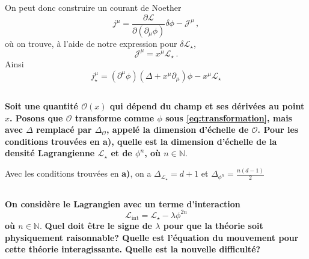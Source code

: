 \documentclass{article}
\numberwithin{equation}{section}
\theoremstyle{solution}
\begin{document}
On peut donc construire un courant de Noether
\begin{equation}
        j^{\mu} = \frac{\partial \mathcal{L}}{\partial (\partial_{\mu}\phi)} \delta  \phi  - \mathcal{J}^{\mu}\, ,
\end{equation} 
où on trouve, à l'aide de notre expression pour $\delta \mathcal{L}_\star$,
\begin{equation}
        \mathcal{J}^{\mu} = x^{\mu}\mathcal{L}_\star\, .
\end{equation} 
Ainsi
\begin{equation}\label{eq:Noether current}
        \boxed{j^{\mu}_\star = (\partial^{\mu} \phi)(\Delta + x^{\mu}\partial_{\mu})\phi - x^{\mu}\mathcal{L}_\star}
\end{equation} 


\subsection{}
\textbf{Soit une quantité $\mathcal{O}(x)$ qui dépend du champ et ses dérivées au point $x$. Posons que $\mathcal{O}$ 
transforme comme $\phi$ sous \eqref{eq:transformation}, mais avec $\Delta$ remplacé par $\Delta_\mathcal{O}$, appelé la dimension d’échelle
de $\mathcal{O}$. Pour les conditions trouvées en a), quelle est la dimension d’échelle de la densité
Lagrangienne $\mathcal{L}_{\star}$ et de $\phi^{n}$, où $n \in \mathbb{N}$}.
\vspace{2ex}

Avec les conditions trouvées en \textbf{a)}, on a $\boxed{\Delta_{\mathcal{L}_\star} = d+1}$ et $\boxed{\Delta_{\phi^{n}} = \frac{n(d-1)}{2}}$

\subsection{}
\textbf{On considère le Lagrangien avec un terme d'interaction}
\begin{equation}\label{eq:Lagrangien2c}
       \mathcal{L}_{\mathrm{int}} = \mathcal{L}_{\star} - \lambda \phi^{2n} 
\end{equation} 
\textbf{où $n \in \mathbb{N}$}.
\textbf{Quel doit être le signe de $\lambda$ pour que la théorie soit physiquement 
raisonnable? Quelle est l’équation du mouvement pour cette théorie interagissante. Quelle est la nouvelle difficulté?}

\vspace{2ex}
\end{document}
